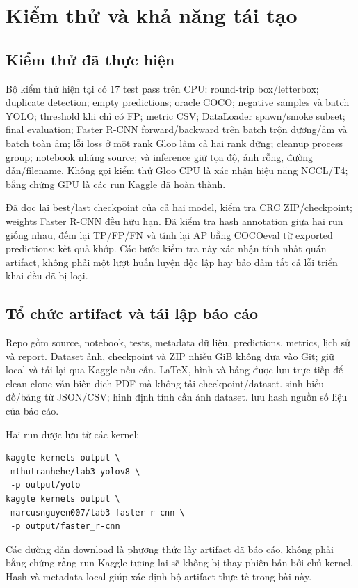 \documentclass[a4paper,10pt,twocolumn]{article}
\newcommand{\FR}{Faster R-CNN}
\begin{document}
\section{Kiểm thử và khả năng tái tạo}
\subsection{Kiểm thử đã thực hiện}
Bộ kiểm thử hiện tại có 17 test pass trên CPU: round-trip box/letterbox; duplicate
detection; empty predictions; oracle COCO; negative samples và batch YOLO; threshold
khi chỉ có FP; metric CSV; DataLoader spawn/smoke subset; final evaluation; \FR{}
forward/backward trên batch trộn dương/âm và batch toàn âm; lỗi loss ở một rank
Gloo làm cả hai rank dừng; cleanup process group; notebook nhúng source; và inference
giữ tọa độ, ảnh rỗng, đường dẫn/filename. Không gọi kiểm thử Gloo CPU là xác nhận
hiệu năng NCCL/T4; bằng chứng GPU là các run Kaggle đã hoàn thành.

Đã đọc lại best/last checkpoint của cả hai model, kiểm tra CRC ZIP/checkpoint;
weights \FR{} đều hữu hạn. Đã kiểm tra hash annotation giữa hai run giống nhau,
đếm lại TP/FP/FN và tính lại AP bằng COCOeval từ exported predictions; kết quả khớp.
Các bước kiểm tra này xác nhận tính nhất quán artifact, không phải một lượt huấn luyện
độc lập hay bảo đảm tất cả lỗi triển khai đều đã bị loại.

\subsection{Tổ chức artifact và tái lập báo cáo}
Repo gồm source, notebook, tests, metadata dữ liệu, predictions, metrics, lịch sử và
report. Dataset ảnh, checkpoint và ZIP nhiều GiB không đưa vào Git; giữ local và
tải lại qua Kaggle nếu cần. LaTeX, hình và bảng được lưu trực tiếp để clean clone
vẫn biên dịch PDF mà không tải checkpoint/dataset.
 sinh biểu đồ/bảng từ JSON/CSV; hình định tính cần ảnh
dataset.  lưu hash nguồn số liệu của báo cáo.

Hai run được lưu từ các kernel:
\begin{lstlisting}
kaggle kernels output \
 mthutranhehe/lab3-yolov8 \
 -p output/yolo
kaggle kernels output \
 marcusnguyen007/lab3-faster-r-cnn \
 -p output/faster_r-cnn
\end{lstlisting}
Các đường dẫn download là phương thức lấy artifact đã báo cáo, không phải bằng
chứng rằng run Kaggle tương lai sẽ không bị thay phiên bản bởi chủ kernel.
Hash và metadata local giúp xác định bộ artifact thực tế trong bài này.
\end{document}
